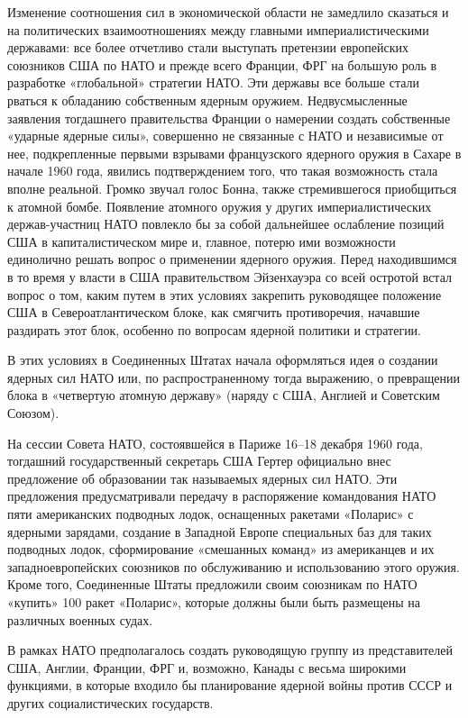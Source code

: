 \documentclass[12pt, a4paper, openany]{book}
\begin{document}
Изменение соотношения сил в экономической области не замедлило сказаться и на политических взаимоотношениях между главными империалистическими державами: все более отчетливо стали выступать претензии европейских союзников США по НАТО и прежде всего Франции, ФРГ на большую роль в разработке «глобальной» стратегии НАТО. Эти державы все больше стали рваться к обладанию собственным ядерным оружием. Недвусмысленные заявления тогдашнего правительства Франции о намерении создать собственные «ударные ядерные силы», совершенно не связанные с НАТО и независимые от нее, подкрепленные первыми взрывами французского ядерного оружия в Сахаре в начале 1960 года, явились подтверждением того, что такая возможность стала вполне реальной. Громко звучал голос Бонна, также стремившегося приобщиться к атомной бомбе. Появление атомного оружия у других империалистических держав-участниц НАТО повлекло бы за собой дальнейшее ослабление позиций США в капиталистическом мире и, главное, потерю ими возможности единолично решать вопрос о применении ядерного оружия. Перед находившимся в то время у власти в США правительством Эйзенхауэра со всей остротой встал вопрос о том, каким путем в этих условиях закрепить руководящее положение США в Североатлантическом блоке, как смягчить противоречия, начавшие раздирать этот блок, особенно по вопросам ядерной политики и стратегии.
	
В этих условиях в Соединенных Штатах начала оформляться идея о создании ядерных сил НАТО или, по распространенному тогда выражению, о превращении блока в «четвертую атомную державу» (наряду с США, Англией и Советским Союзом).
	
На сессии Совета НАТО, состоявшейся в Париже 16–18 декабря 1960 года, тогдашний государственный секретарь США Гертер официально внес предложение об образовании так называемых ядерных сил НАТО. Эти предложения предусматривали передачу в распоряжение командования НАТО пяти американских подводных лодок, оснащенных ракетами «Поларис» с ядерными зарядами, создание в Западной Европе специальных баз для таких подводных лодок, сформирование «смешанных команд» из американцев и их западноевропейских союзников по обслуживанию и использованию этого оружия. Кроме того, Соединенные Штаты предложили своим союзникам по НАТО «купить» 100 ракет «Поларис», которые должны были быть размещены на различных военных судах.
	
В рамках НАТО предполагалось создать руководящую группу из представителей США, Англии, Франции, ФРГ и, возможно, Канады с весьма широкими функциями, в которые входило бы планирование ядерной войны против СССР и других социалистических государств.
	
\end{document}
